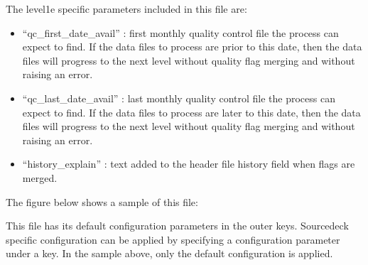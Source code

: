 \documentclass[letterpaper,10pt,english]{sphinxmanual}
\begin{document}
The level1e specific parameters included in this file are:
\begin{itemize}
\item {} 
“qc\_first\_date\_avail” : first monthly quality control file the process can
expect to find. If the data files to process are prior to this date, then
the data files will progress to the next level without quality flag merging
and without raising an error.

\item {} 
“qc\_last\_date\_avail” : last monthly quality control file the process can
expect to find. If the data files to process are later to this date, then
the data files will progress to the next level without quality flag merging
and without raising an error.

\item {} 
“history\_explain” : text added to the header file history field when flags are
merged.

\end{itemize}

The figure below shows a sample of this file:

\begin{sphinxVerbatim}[commandchars=\\\{\}]
   
   
   
    
   
    
\end{sphinxVerbatim}

This file has its default configuration parameters in the outer keys.
Source\sphinxhyphen{}deck specific configuration can be applied by specifying a configuration
parameter under a  key. In the sample above, only the default
configuration is applied.
\end{document}

